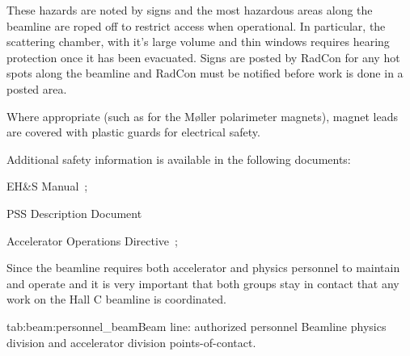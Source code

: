 \begin{safetyen}{0}{0}
These hazards are noted by signs and the most hazardous 
areas along the beamline
are roped off to restrict access when operational.   
In particular, the scattering chamber, with it's large
volume and thin windows requires hearing protection once it has been evacuated.   
Signs are posted by RadCon for any hot spots along the beamline and
RadCon must be notified before work is done in a posted area.

Where appropriate (such as for the M\o ller polarimeter magnets),
magnet leads are covered with plastic guards for electrical safety. 

\noindent{}Additional safety information is available in the following documents:
\begin{list}{--}{\setlength{\itemsep}{-0.15cm}}
  \item EH\&S Manual~\cite{EHScebaf};
  \item PSS Description Document~\cite{PSScebaf}
  \item Accelerator Operations Directive~\cite{AODcebaf};
\end{list}


Since the beamline requires both accelerator and physics personnel to maintain
and operate and it is very important that both groups stay in contact that any 
work on the Hall C beamline is coordinated.

\begin{namestab}{tab:beam:personnel_beam}{Beam line: authorized personnel}{%
   Beamline physics division and accelerator division points-of-contact.}
\end{namestab}
\end{safetyen}


